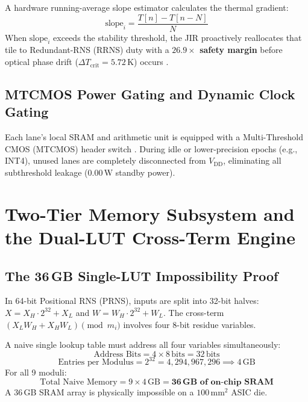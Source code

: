 \documentclass[10pt,journal,compsoc]{IEEEtran}
\begin{document}
A hardware running-average slope estimator calculates the thermal gradient:
\begin{equation}
\text{slope}_i = \frac{T[n] - T[n-N]}{N}
\end{equation}
When $\text{slope}_i$ exceeds the stability threshold, the JIR proactively reallocates that tile to Redundant-RNS (RRNS) duty with a \textbf{$26.9\times$ safety margin} before optical phase drift ($\Delta T_{\text{crit}} = 5.72\,\text{K}$) occurs \cite{intel_alder_lake_pmc}.

\subsection{MTCMOS Power Gating and Dynamic Clock Gating}
Each lane's local SRAM and arithmetic unit is equipped with a Multi-Threshold CMOS (MTCMOS) header switch \cite{tiwari1998power, arm_cortex_a76_trm}. During idle or lower-precision epochs (e.g., INT4), unused lanes are completely disconnected from $V_{\text{DD}}$, eliminating all subthreshold leakage ($0.00\,\text{W}$ standby power).

\section{Two-Tier Memory Subsystem and the Dual-LUT Cross-Term Engine}\label{sec:memory}

\subsection{The 36\,GB Single-LUT Impossibility Proof}
In 64-bit Positional RNS (PRNS), inputs are split into 32-bit halves: $X = X_H \cdot 2^{32} + X_L$ and $W = W_H \cdot 2^{32} + W_L$. The cross-term $(X_L W_H + X_H W_L) \pmod{m_i}$ involves four 8-bit residue variables.

A naive single lookup table must address all four variables simultaneously:
\begin{equation}
\text{Address Bits} = 4 \times 8\,\text{bits} = 32\,\text{bits}
\end{equation}
\begin{equation}
\text{Entries per Modulus} = 2^{32} = 4,294,967,296 \implies 4\,\text{GB}
\end{equation}
For all 9 moduli:
\begin{equation}
\text{Total Naive Memory} = 9 \times 4\,\text{GB} = \mathbf{36\,\text{GB of on-chip SRAM}}
\end{equation}
A 36\,GB SRAM array is physically impossible on a $100\,\text{mm}^2$ ASIC die.
\end{document}
